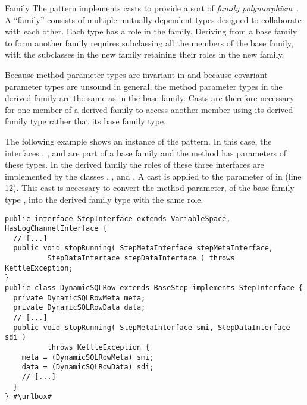 \begin{pattern}{Family}
The \thisp{} pattern implements casts to provide a sort of
\emph{family polymorphism}~\citep{ernstFamilyPolymorphism2001}.
A ``family'' consists of multiple mutually-dependent types designed to
collaborate with each other.
Each type has a role in the family.
Deriving from a base family to form another family requires subclassing all the members of the base family,
with the subclasses in the new family retaining their roles in the new family.

Because method parameter types are invariant in \java{} and because covariant parameter types are unsound in general,
the method parameter types in the derived family are the same as in the base family.
Casts are therefore necessary for one member of a derived family to access
another member using its derived family type rather that its base family
type.


\instances{}
The following example shows an instance of the \thisp{} pattern.
In this case, the interfaces , ,
and  are part of a base family and the
 method has parameters of these types.
In the derived family the roles of these three interfaces are
implemented by the classes
,
, and
.
A cast is applied to the parameter  of  in
 (line 12).
This cast is necessary to convert the method parameter,
of the base family type ,
into the derived family type with the same role.
\def\urlvar{http://bit.ly/pentaho_pentaho_kettle_2FN59J8}
\begin{verbatim}
public interface StepInterface extends VariableSpace, HasLogChannelInterface {
  // [...]
  public void stopRunning( StepMetaInterface stepMetaInterface,
          StepDataInterface stepDataInterface ) throws KettleException;
}
public class DynamicSQLRow extends BaseStep implements StepInterface {
  private DynamicSQLRowMeta meta;
  private DynamicSQLRowData data;
  // [...]
  public void stopRunning( StepMetaInterface smi, StepDataInterface sdi )
          throws KettleException {
    meta = (DynamicSQLRowMeta) smi;
    data = (DynamicSQLRowData) sdi;
    // [...]
  }
} #\urlbox#
\end{verbatim}


\end{pattern}
